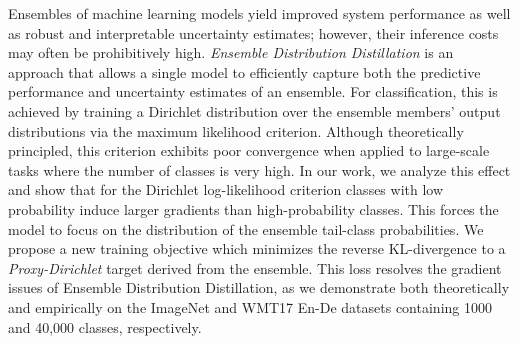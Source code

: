 Ensembles of machine learning models yield improved system performance as well as robust and interpretable uncertainty estimates; however, their inference costs may often be prohibitively high.
\emph{Ensemble Distribution Distillation} is an approach that allows a single model to efficiently capture both the predictive performance and uncertainty estimates of an ensemble. For classification, this is achieved by training a Dirichlet distribution over the ensemble members' output distributions via the maximum likelihood criterion. Although theoretically principled, this criterion exhibits poor convergence when applied to large-scale tasks where the number of classes is very high.
In our work, we analyze this effect and show that for the Dirichlet log-likelihood criterion classes with low probability induce larger gradients than high-probability classes. This forces the model to focus on the distribution of the ensemble tail-class probabilities.
We propose a new training objective which minimizes the reverse KL-divergence to a \emph{Proxy-Dirichlet} target derived from the ensemble. This loss resolves the gradient issues of Ensemble Distribution Distillation, as we demonstrate both theoretically and empirically on the ImageNet and WMT17 En-De datasets containing 1000 and 40,000 classes, respectively.